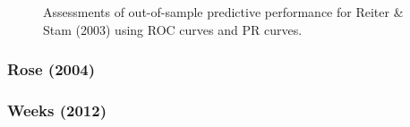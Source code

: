 \begin{figure}
	\centering   
	\caption{Assessments of out-of-sample predictive performance for Reiter \& Stam (2003) using ROC curves and PR curves.}
\end{figure}
\FloatBarrier

\subsubsection*{Rose (2004)}


\subsubsection*{Weeks (2012)}

